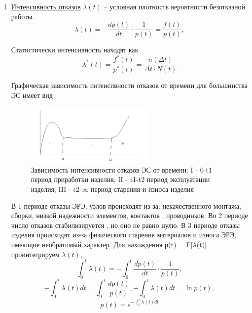 \documentclass[unicode, 12pt, a4paper, oneside]{article}
\begin{document}
\begin{enumerate}
\item \underline{Интенсивность отказов} $\lambda (t)$ – условная плотность вероятности безотказной работы.
\begin{equation} \lambda (t) = -  \frac{dp(t)}{dt} \cdot \frac{1}{p(t)} =  \frac{f(t)}{p(t)},
\end{equation}

Статистически интенсивность находят как\\
\begin{equation} \lambda^{*}(t)=\frac {f^{*}(t)}{p^{*}(t)}=\frac{n(\Delta t)}{\Delta t \cdot N(t)}
\end{equation}

Графическая зависимость интенсивности отказов от времени для большинства ЭС имеет вид\\
\begin{figure}[H]
\centering
\includegraphics[width=0.6\textwidth]{38_Zhizn2.png}
\caption{Зависимость интенсивности отказов ЭС от времени: I - 0-t1 период приработки изделия, II - t1-t2 период эксплуатации изделия, III - t2-$\infty$ период старения и износа изделия}
\label{fig:Zhizn}
\end{figure}
В 1 периоде отказы ЭРЭ, узлов  происходят из-за: некачественного монтажа, сборки, низкой надежности элементов, контактов , проводников.
Во 2 периоде число отказов стабилизируется , но оно не равно нулю.
В 3 периоде отказы изделия происходят из-за физического старения материалов и износа ЭРЭ, имеющие необратимый характер.
Для нахождения р(t) = F[$\lambda$(t)] проинтегрируем $\lambda(t)$,
\begin{equation}\int_0^t \lambda (t) =- \int_0^t \frac{dp(t)}{dt} \cdot \frac{1}{p(t)} ,
\end{equation}
\begin{equation} -\int_0^t \lambda (t)dt = \int_0^t \frac{dp(t)}{p(t)}, -\int_0^t \lambda (t)dt = \ln p(t) ,
\end{equation}
\begin{equation}
p(t) = e^{- \int_{0}^{t} \lambda(t)dt}
\end{equation}


\end{enumerate}
\end{document}
